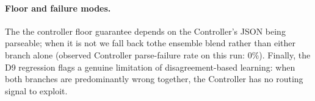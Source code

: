 \paragraph{Floor and failure modes.}
The the controller floor guarantee depends on the Controller's JSON being
parseable; when it is not we fall back tothe ensemble blend rather
than either branch alone (observed Controller parse-failure rate
on this run: $0\%$). Finally, the D9 regression flags a genuine
limitation of disagreement-based learning: when both branches are
predominantly wrong together, the Controller has no routing
signal to exploit.
